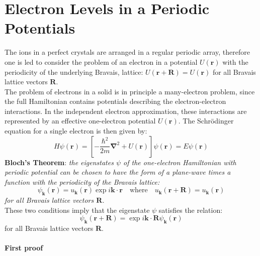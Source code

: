 \documentclass[10.75pt,a4paper,openright,bottom=2cm]{article}
\renewcommand{\Vec}[1]{\boldsymbol{#1}}
\begin{document}
\section{Electron Levels in a Periodic Potentials}
The ions in a perfect crystals are arranged in a regular periodic array, therefore one is led to consider the problem of an electron in a potential $U(\Vec{r})$ with the periodicity of the underlying Bravais, lattice: $U(\Vec{r}+\Vec{R})=U(\Vec{r})$ for all Bravais lattice vectors $\Vec{R}$.\\
The problem of electrons in a solid is in principle a many-electron problem, since the full Hamiltonian contains potentials describing the electron-electron interactions. In the independent electron approximation, these interactions are represented by an effective one-electron potential $U(\Vec{r})$. The Schr\"odinger equation for a single electron is then given by:
\[
H\psi(\Vec{r})=\left[-\frac{\hbar^2}{2m}\Vec{\nabla}^2+U(\Vec{r})\right]\psi(\Vec{r})=E\psi(\Vec{r})
\]
\textbf{Bloch's Theorem}: \textit{the eigenstates $\psi$ of the one-electron Hamiltonian with periodic potential can be chosen to have the form of a plane-wave times a function with the periodicity of the Bravais lattice:}
\[
\psi_{\Vec{k}}(\Vec{r})=u_{\Vec{k}}(\Vec{r})\exp{i\Vec{k}\cdot\Vec{r}} \quad \text{where} \quad u_{\Vec{k}}(\Vec{r}+\Vec{R})=u_{\Vec{k}}(\Vec{r})
\]
\textit{for all Bravais lattice vectors $\Vec{R}$.}\\
These two conditions imply that the eigenstate $\psi$ satisfies the relation:
\[
\psi_{\Vec{k}}(\Vec{r}+\Vec{R})=\exp{i\Vec{k}\cdot\Vec{R}}\psi_{\Vec{k}}(\Vec{r})
\]
for all Bravais lattice vectors $\Vec{R}$.\\\\
\textbf{First proof}
\end{document}
